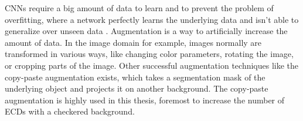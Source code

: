 \acp{CNN} require a big amount of data to learn and to prevent the problem of overfitting, where a network perfectly learns the underlying data and isn't able to generalize over unseen data \cite{augmentation_survey}.
Augmentation is a way to artificially increase the amount of data.
In the image domain for example, images normally are transformed in various ways, like changing color parameters, rotating the image, or cropping parts of the image.
Other successful augmentation techniques like the copy-paste augmentation \cite{copypaste_aug} exists, which takes a segmentation mask of the underlying object and projects it on another background.
The copy-paste augmentation is highly used in this thesis, foremost to increase the number of \acp{ECD} with a checkered background.
